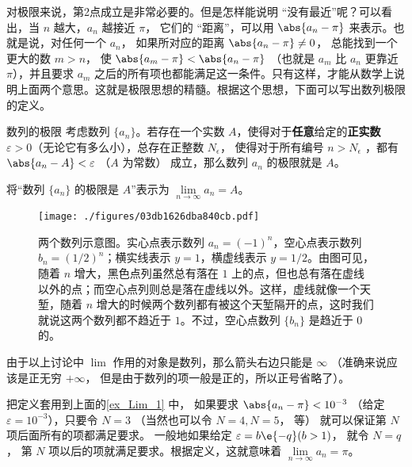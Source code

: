 对极限来说，第2点成立是非常必要的。但是怎样能说明 “没有最近”呢？可以看出，当 $n$ 越大，$a_n$ 越接近 $\pi$， 它们的 “距离”，可以用 $\abs{a_n - \pi}$ 来表示。也就是说，对任何一个 $a_n$， 如果所对应的距离 $\abs{a_n - \pi } \ne 0$， 总能找到一个更大的数 $m>n$， 使 $\abs{a_m - \pi} < \abs{a_n - \pi}$ （也就是 $a_m$ 比 $a_n$ 更靠近 $\pi$），并且要求 $a_m$ 之后的所有项也都能满足这一条件。只有这样，才能从数学上说明上面两个意思。这就是极限思想的精髓。根据这个思想，下面可以写出数列极限的定义。



\begin{definition}{数列的极限}\label{def_Lim_2}
考虑数列 $\{a_n\}$。若存在一个实数 $A$，使得对于\textbf{任意}给定的\textbf{正实数} $\varepsilon > 0$（无论它有多么小），总存在正整数 $N_\epsilon$， 使得对于所有编号 $n>N_\epsilon$ ，都有 $\abs{a_n - A} < \varepsilon$ （$A$ 为常数） 成立，那么数列 $a_n$ 的极限就是 $A$。

将“数列 $\{a_n\}$ 的极限是 $A$”表示为 $\lim\limits_{n\to\infty}a_n=A$。
\end{definition}
 
\begin{figure}[ht]
\centering
\texttt{[image: ./figures/03db1626dba840cb.pdf]}
\caption{两个数列示意图。实心点表示数列 $a_n=(-1)^{n}$，空心点表示数列 $b_n=(1/2)^n$；横实线表示 $y=1$，横虚线表示 $y=1/2$。由图可见，随着 $n$ 增大，黑色点列虽然总有落在 $1$ 上的点，但也总有落在虚线以外的点；而空心点列则总是落在虚线以外。这样，虚线就像一个天堑，随着 $n$ 增大的时候两个数列都有被这个天堑隔开的点，这时我们就说这两个数列都不趋近于 $1$。不过，空心点数列 $\{b_n\}$ 是趋近于 $0$ 的。} \label{fig_Lim_1}
\end{figure}


由于以上讨论中 $\lim$ 作用的对象是数列，那么箭头右边只能是 $\infty$ （准确来说应该是正无穷 $+\infty$， 但是由于数列的项一般是正的，所以正号省略了）。

把定义套用到上面的\autoref{ex_Lim_1} 中， 如果要求 $\abs{a_n - \pi} < 10^{-3}$ （给定 $\varepsilon  = 10^{-3}$），只要令 $N=3$ （当然也可以令 $N=4, N=5$， 等） 就可以保证第 $N$ 项后面所有的项都满足要求。 一般地如果给定 $\varepsilon  = b\e{-q}  (b > 1)$， 就令 $N = q$， 第 $N$ 项以后的项就满足要求。根据定义，这就意味着 $\lim\limits_{n \to \infty } a_n = \pi$。 

